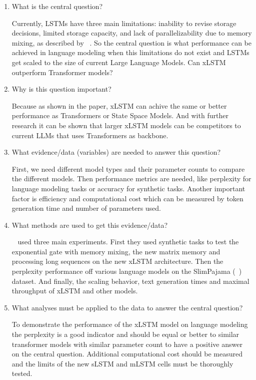 \documentclass[a4paper,oneside,10pt,ngerman,english]{scrartcl}
\begin{document}
\begin{enumerate}

\item What is the central question?

Currently, LSTMs have three main limitations: inability to revise storage decisions, limited storage capacity, and lack of parallelizability due to memory mixing, as described by \citeauthor{beck2024xlstmextendedlongshortterm}~\cite{beck2024xlstmextendedlongshortterm}. So the central question is what performance can be achieved in language modeling when this limitations do not exist and LSTMs get scaled to the size of current Large Language Models. Can xLSTM outperform Transformer models?

\item Why is this question important?

Because as shown in the paper, xLSTM can achive the same or better performance as Transformers or State Space Models. And with further research it can be shown that larger xLSTM models can be competitors to current LLMs that uses Transformers as backbone. 

\item What evidence/data (variables) are needed to answer this question?

First, we need different model types and their parameter counts to compare the different models. Then performance metrics are needed, like perplexity for language modeling tasks or accuracy for synthetic tasks. Another important factor is efficiency and computational cost which can be measured by token generation time and number of parameters used.

\item What methods are used to get this evidence/data?

\citeauthor{beck2024xlstmextendedlongshortterm}~\cite{beck2024xlstmextendedlongshortterm} used three main experiments. First they used synthetic tasks to test the exponential gate with memory mixing, the new matrix memory and processing long sequences on the new xLSTM architecture. Then the perplexity performance off various language models on the SlimPajama (\citeauthor{cerebras2023slimpajama}~\cite{cerebras2023slimpajama}) dataset. And finally, the scaling behavior, text generation times and maximal throughput of xLSTM and other models.

\item What analyses must be applied to the data to answer the central question?

To demonstrate the performance of the xLSTM model on language modeling the perplexity is a good indicator and should be equal or better to similar transformer models with similar parameter count to have a positive answer on the central question. Additional computational cost should be measured and the limits of the new sLSTM and mLSTM cells must be thoroughly tested.


\end{enumerate}
\end{document}
